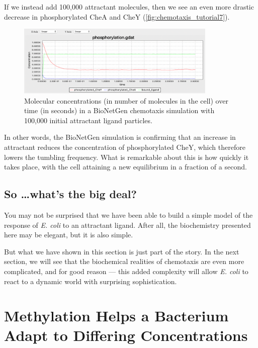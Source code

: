 If we instead add 100,000 attractant molecules, then we see an even more drastic decrease in phosphorylated CheA and CheY (\autoref{fig:chemotaxis_tutorial7}).

\begin{figure}[h]
\centering
\mySfFamily
\includegraphics[width = 0.85\textwidth]{../images/chemotaxis_tutorial7.png}
\caption{Molecular concentrations (in number of molecules in the cell) over time (in seconds) in a BioNetGen chemotaxis simulation with 100,000 initial attractant ligand particles.}
\label{fig:chemotaxis_tutorial7}
\end{figure}


In other words, the BioNetGen simulation is confirming that an increase in attractant reduces the concentration of phosphorylated CheY, which therefore lowers the tumbling frequency. What is remarkable about this is how quickly it takes place, with the cell attaining a new equilibrium in a fraction of a second.


\FloatBarrier
{}
\subsection{So \ldots what's the big deal?}

You may not be surprised that we have been able to build a simple model of the response of \textit{E. coli} to an attractant ligand. After all, the biochemistry presented here may be elegant, but it is also simple.

But what we have shown in this section is just part of the story. In the next section, we will see that the biochemical realities of chemotaxis are even more complicated, and for good reason --- this added complexity will allow \textit{E. coli} to react to a dynamic world with surprising sophistication.\\

\FloatBarrier
{}

\section{Methylation Helps a Bacterium Adapt to Differing Concentrations}
\label{sec:methylation}

